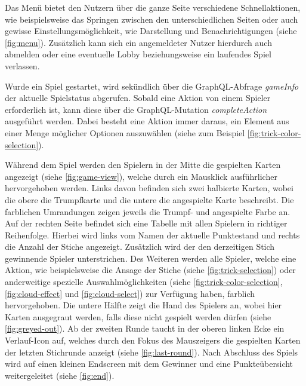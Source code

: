 Das Menü bietet den Nutzern über die ganze Seite verschiedene Schnellaktionen, wie beispielsweise das Springen zwischen den unterschiedlichen Seiten oder auch gewisse Einstellungsmöglichkeit, wie Darstellung und Benachrichtigungen (siehe \cref{fig:menu}). Zusätzlich kann sich ein angemeldeter Nutzer hierdurch auch abmelden oder eine eventuelle Lobby beziehungsweise ein laufendes Spiel verlassen.

Wurde ein Spiel gestartet, wird sekündlich über die GraphQL-Abfrage \textit{gameInfo} der aktuelle Spielstatus abgerufen. Sobald eine Aktion von einem Spieler erforderlich ist, kann diese über die GraphQL-Mutation \textit{completeAction} ausgeführt werden. Dabei besteht eine Aktion immer daraus, ein Element aus einer Menge möglicher Optionen auszuwählen (siehe zum Beispiel \cref{fig:trick-color-selection}).

Während dem Spiel werden den Spielern in der Mitte die gespielten Karten angezeigt (siehe \cref{fig:game-view}), welche durch ein Mausklick ausführlicher hervorgehoben werden. Links davon befinden sich zwei halbierte Karten, wobei die obere die Trumpfkarte und die untere die angespielte Karte beschreibt. Die farblichen Umrandungen zeigen jeweils die Trumpf- und angespielte Farbe an. Auf der rechten Seite befindet sich eine Tabelle mit allen Spielern in richtiger Reihenfolge. Hierbei wird links vom Namen der aktuelle Punktestand und rechts die Anzahl der Stiche angezeigt. Zusätzlich wird der den derzeitigen Stich gewinnende Spieler unterstrichen. Des Weiteren werden alle Spieler, welche eine Aktion, wie beispielsweise die Ansage der Stiche (siehe \cref{fig:trick-selection}) oder anderweitige spezielle Auswahlmöglichkeiten (siehe \cref{fig:trick-color-selection}, \cref{fig:cloud-effect} und \cref{fig:cloud-select}) zur Verfügung haben, farblich hervorgehoben. Die untere Hälfte zeigt die Hand des Spielers an, wobei hier Karten ausgegraut werden, falls diese nicht gespielt werden dürfen (siehe \cref{fig:greyed-out}). Ab der zweiten Runde taucht in der oberen linken Ecke ein Verlauf-Icon auf, welches durch den Fokus des Mauszeigers die gespielten Karten der letzten Stichrunde anzeigt (siehe \cref{fig:last-round}). Nach Abschluss des Spiels wird auf einen kleinen Endscreen mit dem Gewinner und eine Punkteübersicht weitergeleitet (siehe \cref{fig:end}).

